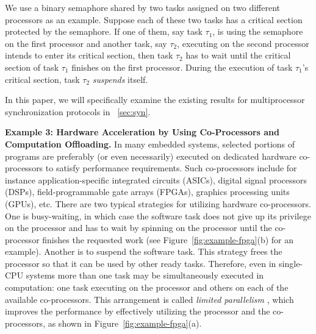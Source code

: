 We use a binary semaphore shared by two tasks assigned on two different processors as an example. Suppose each of these two tasks has a critical section protected by the semaphore. If one of them, say task $\tau_1$, is using the semaphore on the first processor and another task, say $\tau_2$, executing on the second processor intends to enter its critical section, then task $\tau_2$ has to wait until the critical section of task $\tau_1$ finishes on the first processor. During the execution of task $\tau_1$'s critical section, task $\tau_2$ \emph{suspends} itself. 


In this paper, we will specifically examine the existing results for multiprocessor synchronization protocols in \mysectionref{}~\ref{sec:syn}. %

{\bf Example 3: Hardware Acceleration by Using Co-Processors and Computation Offloading.} \hspace{0.1in}
 In many embedded systems, selected portions of programs are preferably (or even necessarily) executed on dedicated hardware co-processors to satisfy performance requirements.  Such co-processors include for instance application-specific integrated circuits (ASICs), digital signal processors (DSPs), field-programmable gate arrays (FPGAs), graphics processing units (GPUs), etc. There are two typical strategies for utilizing hardware co-processors. One is busy-waiting, in which case the software task does not give up its privilege on the processor and has to wait by spinning on the processor until the co-processor finishes the requested work (see Figure~\ref{fig:example-fpga}(b) for an example). Another is to suspend the software task. This strategy frees the processor so that it can be used by other ready tasks. Therefore, even in single-CPU systems more than one task may be simultaneously executed in computation: one task executing on the processor and others on each of the available co-processors. This arrangement is called \emph{limited parallelism} \cite{RTAS-AudsleyB04}, which improves the performance by effectively utilizing the processor and the co-processors, as shown in Figure~\ref{fig:example-fpga}(a).

